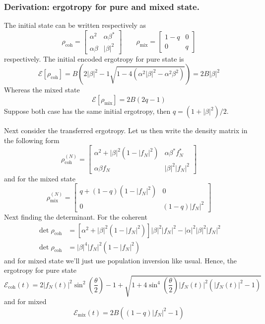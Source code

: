 \documentclass[../../../main.tex]{subfiles}
\begin{document}
\subsubsection{Derivation: ergotropy for pure and mixed state.}
The initial state can be written respectively as
\begin{equation*}
  \rho_\text{coh}
  = \begin{bmatrix}
    \alpha^2    & \alpha\beta^* \\
    \alpha\beta & |\beta|^2
  \end{bmatrix}
  \qquad
  \rho_\text{mix}
  = \begin{bmatrix}
    1-q & 0 \\
    0   & q
  \end{bmatrix}
\end{equation*}
respectively.
The initial encoded ergotropy for pure state is
\begin{equation*}
  \mathcal{E}[\rho_\text{coh}]
  = B(2|\beta|^2-1 \sqrt{1-4(\alpha^2|\beta|^2-\alpha^2\beta^2)})
  = 2B|\beta|^2
\end{equation*}
Whereas the mixed state
\begin{equation*}
  \mathcal{E}[\rho_\text{mix}] = 2B(2q- 1)
\end{equation*}
Suppose both case has the same initial ergotropy, then $q = (1+|\beta|^2)/2$.

Next consider the transferred ergotropy.
Let us then write the density matrix in the following form
\begin{equation*}
  \rho_\text{coh}^{(N)}
  = \begin{bmatrix}
    \alpha^2 + |\beta|^2 (1-|f_N|^2) & \alpha\beta^*  f_N^* \\
    \alpha\beta  f_N                 & |\beta|^2 |f_N|^2
  \end{bmatrix}
\end{equation*}
and for the mixed state
\begin{equation*}
  \rho_\text{mix}^{(N)}
  = \begin{bmatrix}
    q + (1-q) (1-|f_N|^2) & 0            \\
    0                     & (1-q)|f_N|^2
  \end{bmatrix}
\end{equation*}
Next finding the determinant.
For the coherent
\begin{align*}
  \det \rho_\text{coh} & = [\alpha^2 + |\beta|^2 (1-|f_N|^2)]|\beta|^2|f_N|^2 - |\alpha|^2|\beta|^2|f_N|^2 \\
  \det \rho_\text{coh} & = |\beta|^4|f_N|^2 (1-|f_N|^2)
\end{align*}
and for mixed state we'll just use population inversion like usual.
Hence, the ergotropy for pure state
\begin{equation*}
  \mathcal{E}_\text{coh} (t) = 2|f_N(t)|^2\sin^2\left(\frac{\theta}{2}\right)-1+\sqrt{1+4\sin^4\left(\frac{\theta}{2}\right)|f_N(t)|^2\left(|f_N(t)|^2-1\right)}
\end{equation*}
and for mixed
\begin{equation*}
  \mathcal{E}_\text{mix}(t) = 2B((1-q)|f_N|^2-1)
\end{equation*}
\end{document}
